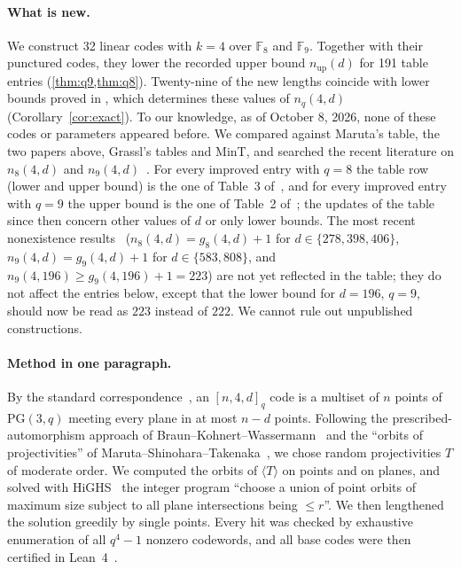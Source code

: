 \documentclass[11pt]{article}
\numberwithin{equation}{section}
\theoremstyle{definition}
\theoremstyle{remark}
\newcommand{\F}{\mathbb F}
\newcommand{\PG}{\mathrm{PG}}
\begin{document}
\paragraph{What is new.} We construct 32 linear codes with $k=4$ over $\F_8$ and $\F_9$. Together with
their punctured codes, they lower the recorded upper bound $n_{\mathrm{up}}(d)$ for 191 table entries
(\cref{thm:q9,thm:q8}). Twenty-nine of the new lengths coincide with lower bounds proved in
\cite{KanazawaMaruta2011,KOM2017}, which determines these values of $n_q(4,d)$ (Corollary~\ref{cor:exact}).
To our knowledge, as of October 8, 2026, none of these codes or parameters appeared before. We
compared against Maruta's table, the two papers above, Grassl's tables and MinT, and searched the
recent literature on $n_8(4,d)$ and $n_9(4,d)$~\cite{BFM2021,MaLuo2024,KKM2026}. For every improved
entry with $q=8$ the table row (lower and upper bound) is the one of Table~3 of~\cite{KanazawaMaruta2011},
and for every improved entry with $q=9$ the upper bound is the one of Table~2 of~\cite{KOM2017}; the
updates of the table since then concern other values of $d$ or only lower bounds. The most recent
nonexistence results~\cite[Thm.~1.3]{KKM2026} ($n_8(4,d)=g_8(4,d)+1$ for $d\in\{278,398,406\}$,
$n_9(4,d)=g_9(4,d)+1$ for $d\in\{583,808\}$, and $n_9(4,196)\ge g_9(4,196)+1=223$) are not yet
reflected in the table; they do not affect the entries below, except that the lower bound for
$d=196$, $q=9$, should now be read as $223$ instead of $222$. We cannot rule out unpublished
constructions.

\paragraph{Method in one paragraph.} By the standard correspondence~\cite{Hamada1993}, an
$[n,4,d]_q$ code is a multiset of $n$ points of $\PG(3,q)$ meeting every plane in at most $n-d$
points. Following the prescribed-automorphism approach of Braun--Kohnert--Wassermann~\cite{BKW2005}
and the ``orbits of projectivities'' of Maruta--Shinohara--Takenaka~\cite{MST2008}, we chose random
projectivities $T$ of moderate order. We computed the orbits of $\langle T\rangle$ on points and on
planes, and solved with HiGHS~\cite{HiGHS} the integer program ``choose a union of point orbits of
maximum size subject to all plane intersections being $\le r$''. We then lengthened the solution
greedily by single points. Every hit was checked by exhaustive enumeration of all $q^4-1$ nonzero
codewords, and all base codes were then certified in Lean~4~\cite{Lean4}.
\end{document}
